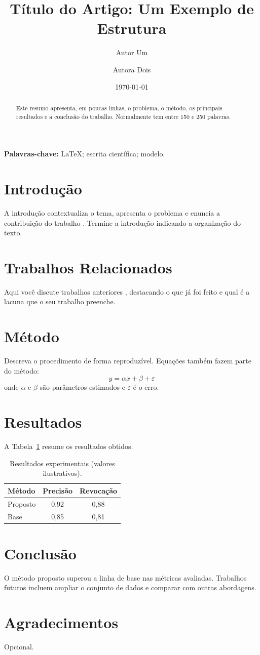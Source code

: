 \documentclass[12pt, a4paper]{article}
\title{Título do Artigo: Um Exemplo de Estrutura}
\author{Autor Um \and Autora Dois}
\date{\today}
\begin{document}
\maketitle

\begin{abstract}
Este resumo apresenta, em poucas linhas, o problema, o método, os principais
resultados e a conclusão do trabalho. Normalmente tem entre 150 e 250 palavras.
\end{abstract}

\noindent\textbf{Palavras-chave:} LaTeX; escrita científica; modelo.

\section{Introdução}
A introdução contextualiza o tema, apresenta o problema e enuncia a contribuição
do trabalho \cite{lamport1994}. Termine a introdução indicando a organização do texto.

\section{Trabalhos Relacionados}
Aqui você discute trabalhos anteriores \cite{knuth1984, exemplo2020}, destacando
o que já foi feito e qual é a lacuna que o seu trabalho preenche.

\section{Método}
Descreva o procedimento de forma reproduzível. Equações também fazem parte do método:
\begin{equation}
    y = \alpha x + \beta + \varepsilon
    \label{eq:modelo}
\end{equation}
onde $\alpha$ e $\beta$ são parâmetros estimados e $\varepsilon$ é o erro.

\section{Resultados}
A Tabela~\ref{tab:resultados} resume os resultados obtidos.

\begin{table}[h]
    \centering
    \caption{Resultados experimentais (valores ilustrativos).}
    \label{tab:resultados}
    \begin{tabular}{lcc}
        \toprule
        Método   & Precisão & Revocação \\
        \midrule
        Proposto & 0,92     & 0,88      \\
        Base     & 0,85     & 0,81      \\
        \bottomrule
    \end{tabular}
\end{table}

\section{Conclusão}
O método proposto superou a linha de base nas métricas avaliadas. Trabalhos futuros
incluem ampliar o conjunto de dados e comparar com outras abordagens.

\section*{Agradecimentos}
Opcional.

\printbibliography[title={Referências}]
\end{document}
